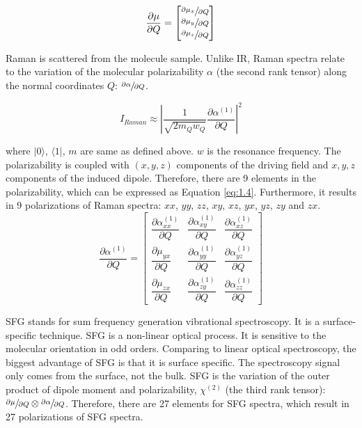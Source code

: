 \begin{equation} \label{eq:1.2}
\frac{\partial\mu}{\partial Q} = \begin{bmatrix}
									\sfrac{\partial\mu_{x}}{\partial Q} \\
									\sfrac{\partial\mu_{y}}{\partial Q} \\
									\sfrac{\partial\mu_{z}}{\partial Q}
								  \end{bmatrix}
\end{equation}

Raman is scattered from the molecule sample. Unlike IR, Raman spectra relate to the variation of the molecular polarizability $\alpha$ (the second rank tensor) along the normal coordinates $Q$: $\sfrac{\partial\alpha}{\partial Q}$. 

\begin{equation} \label{eq:1.3}
I_{Raman} \approx \left| \frac{1}{\sqrt{2m_{Q}w_{Q}}} \frac{\partial\alpha^{(1)}}{\partial Q} \right|^{2}
\end{equation}

where $|0\rangle$, $\langle 1|$, $m$ are same as defined above. $w$ is the resonance frequency. The polarizability is coupled with $(x, y, z)$ components of the driving field and $x, y, z$ components of the induced dipole. Therefore, there are 9 elements in the polarizability, which can be expressed as Equation \ref{eq:1.4}. Furthermore, it results in 9 polarizations of Raman spectra: $xx$, $yy$, $zz$, $xy$, $xz$, $yx$, $yz$, $zy$ and $zx$. \\

\begin{equation} \label{eq:1.4}
\frac{\partial\alpha^{(1)}}{\partial Q} = \begin{bmatrix}
\dfrac{\partial\alpha_{xx}^{(1)}}{\partial Q} & \dfrac{\partial\alpha_{xy}^{(1)}}{\partial Q} & \dfrac{\partial\alpha_{xz}^{(1)}}{\partial Q} \\
\dfrac{\partial\mu_{yx}}{\partial Q} & \dfrac{\partial\alpha_{yy}^{(1)}}{\partial Q} & \dfrac{\partial\alpha_{yz}^{(1)}}{\partial Q}\\
\dfrac{\partial\mu_{zx}}{\partial Q} & \dfrac{\partial\alpha_{zy}^{(1)}}{\partial Q} & \dfrac{\partial\alpha_{zz}^{(1)}}{\partial Q}
\end{bmatrix}
\end{equation}

SFG stands for sum frequency generation vibrational spectroscopy. It is a surface-specific technique. SFG is a non-linear optical process. It is sensitive to the molecular orientation in odd orders. Comparing to linear optical spectroscopy, the biggest advantage of SFG is that it is surface specific. The spectroscopy signal only comes from the surface, not the bulk. SFG is the variation of the outer product of dipole moment and polarizability, $\chi^{(2)}$ (the third rank tensor): $\sfrac{\partial\mu}{\partial Q} \otimes \sfrac{\partial\alpha}{\partial Q} $. Therefore, there are 27 elements for SFG spectra, which result in 27 polarizations of SFG spectra. \\

